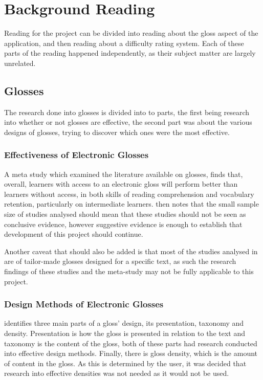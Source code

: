 \chapter{Background Reading}

Reading for the project can be divided into reading about the gloss aspect of the application, and then reading about a difficulty rating system. Each of these parts of the reading happened independently, as their subject matter are largely unrelated.


\section{Glosses}

The research done into glosses is divided into to parts, the first being research into whether or not glosses are effective, the second part was about the various designs of glosses, trying to discover which ones were the most effective.

\subsection{Effectiveness of Electronic Glosses}

A meta study \autocite{abraham2008} which examined the literature available on glosses, finds that, overall, learners with access to an electronic gloss will perform better than learners without access, in both skills of reading comprehension and vocabulary retention, particularly on intermediate learners. \textcite{abraham2008} then notes that the small sample size of studies analysed should mean that these studies should not be seen as conclusive evidence, however suggestive evidence is enough to establish that development of this project should continue.

Another caveat that should also be added is that most of the studies analysed in \textcite{abraham2008} are of tailor-made glosses designed for a specific text, as such the research findings of these studies and the meta-study may not be fully applicable to this project.


\subsection{Design Methods of Electronic Glosses}

\textcite{roby1999} identifies three main parts of a gloss' design, its presentation, taxonomy and density. Presentation is how the gloss is presented in relation to the text and taxonomy is the content of the gloss, both of these parts had research conducted into effective design methods. Finally, there is gloss density, which is the amount of content in the gloss. As this is determined by the user, it was decided that research into effective densities was not needed as it would not be used.

